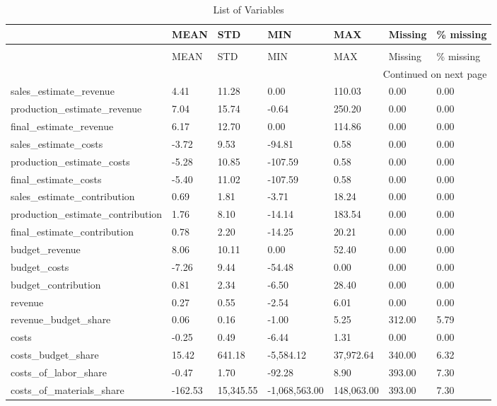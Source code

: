 \begin{longtable}[h!]{lllllll}
\caption{List of Variables} \label{eda_1} \\
\toprule
 & MEAN & STD & MIN & MAX & Missing & \% missing \\
\midrule
\endfirsthead
\caption[]{List of Variables} \\
\toprule
 & MEAN & STD & MIN & MAX & Missing & \% missing \\
\midrule
\endhead
\midrule
\multicolumn{7}{r}{Continued on next page} \\
\midrule
\endfoot
\bottomrule
\endlastfoot
sales_estimate_revenue & 4.41 & 11.28 & 0.00 & 110.03 & 0.00 & 0.00 \\
production_estimate_revenue & 7.04 & 15.74 & -0.64 & 250.20 & 0.00 & 0.00 \\
final_estimate_revenue & 6.17 & 12.70 & 0.00 & 114.86 & 0.00 & 0.00 \\
sales_estimate_costs & -3.72 & 9.53 & -94.81 & 0.58 & 0.00 & 0.00 \\
production_estimate_costs & -5.28 & 10.85 & -107.59 & 0.58 & 0.00 & 0.00 \\
final_estimate_costs & -5.40 & 11.02 & -107.59 & 0.58 & 0.00 & 0.00 \\
sales_estimate_contribution & 0.69 & 1.81 & -3.71 & 18.24 & 0.00 & 0.00 \\
production_estimate_contribution & 1.76 & 8.10 & -14.14 & 183.54 & 0.00 & 0.00 \\
final_estimate_contribution & 0.78 & 2.20 & -14.25 & 20.21 & 0.00 & 0.00 \\
budget_revenue & 8.06 & 10.11 & 0.00 & 52.40 & 0.00 & 0.00 \\
budget_costs & -7.26 & 9.44 & -54.48 & 0.00 & 0.00 & 0.00 \\
budget_contribution & 0.81 & 2.34 & -6.50 & 28.40 & 0.00 & 0.00 \\
revenue & 0.27 & 0.55 & -2.54 & 6.01 & 0.00 & 0.00 \\
revenue_budget_share & 0.06 & 0.16 & -1.00 & 5.25 & 312.00 & 5.79 \\
costs & -0.25 & 0.49 & -6.44 & 1.31 & 0.00 & 0.00 \\
costs_budget_share & 15.42 & 641.18 & -5,584.12 & 37,972.64 & 340.00 & 6.32 \\
costs_of_labor_share & -0.47 & 1.70 & -92.28 & 8.90 & 393.00 & 7.30 \\
costs_of_materials_share & -162.53 & 15,345.55 & -1,068,563.00 & 148,063.00 & 393.00 & 7.30 \\

\end{longtable}
